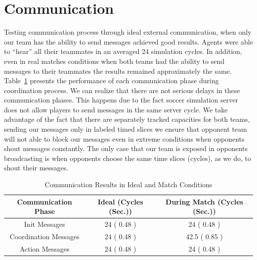 \section{Communication}
Testing communication process through ideal external communication, when only our team has the ability to send messages achieved good results. Agents were able to ``hear'' all their teammates in an averaged 24 simulation cycles. In addition, even in real matches conditions when both teams had the ability to send messages to their teammates the results remained approximately the same. Table~\ref{CommunicationResults} presents the performance of each communication phase during coordination process. We can realize that there are not serious delays in these communication phases. This happens due to the fact soccer simulation server does not allow players to send messages in the same server cycle. We take advantage of the fact that there are separately tracked capacities for both teams, sending our messages only in labeled timed slices we ensure that opponent team will not able to block our messages even in extreme conditions when opponents shout messages constantly. The only case that our team is exposed in opponents broadcasting is when opponents choose the same time slices (cycles), as we do, to shout their messages.

\begin{table}[b!]
\caption{Communication Results in Ideal and Match Conditions}
\label{CommunicationResults}
\begin{center}
\begin{small}
    \begin{tabular}{ccc}
    \textbf{Communication Phase} 	& \textbf{Ideal (Cycles (Sec.))}			& \textbf{During Match (Cycles (Sec.))} \\
    \midrule
    Init Messages 					& 24  ( 0.48 ) 			& 24 	( 0.48 )		\\
    Coordination Messages			& 24  ( 0.48 )			& 42.5  ( 0.85 )		\\
    Action Messages 				    & 24  ( 0.48 )			& 24 ( 0.48 )	 		\\
    \end{tabular}
    \end{small}
\end{center}
\end{table}






